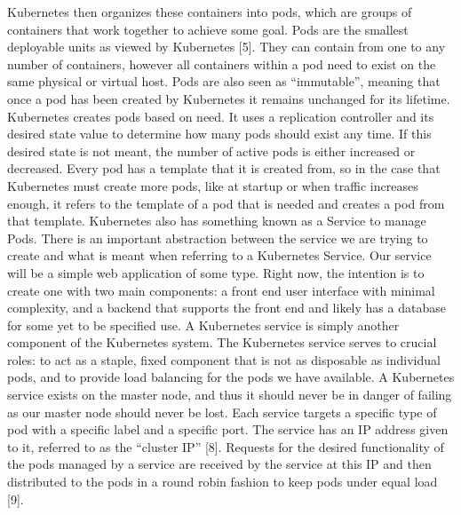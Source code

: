 \documentclass[thesis,proposal]{umassthesis}  %
\begin{document}
Kubernetes then organizes these containers into pods, which are groups of containers that work together to achieve some goal. Pods are the smallest deployable units as viewed by Kubernetes [5]. They can contain from one to any number of containers, however all containers within a pod need to exist on the same physical or virtual host. Pods are also seen as “immutable”, meaning that once a pod has been created by Kubernetes it remains unchanged for its lifetime. Kubernetes creates pods based on need. It uses a replication controller and its desired state value to determine how many pods should exist any time. If this desired state is not meant, the number of active pods is either increased or decreased. Every pod has a template that it is created from, so in the case that Kubernetes must create more pods, like at startup or when traffic increases enough, it refers to the template of a pod that is needed and creates a pod from that template.
Kubernetes also has something known as a Service to manage Pods. There is an important abstraction between the service we are trying to create and what is meant when referring to a Kubernetes Service. Our service will be a simple web application of some type. Right now, the intention is to create one with two main components: a front end user interface with minimal complexity, and a backend that supports the front end and likely has a database for some yet to be specified use.
A Kubernetes service is simply another component of the Kubernetes system. The Kubernetes service serves to crucial roles: to act as a staple, fixed component that is not as disposable as individual pods, and to provide load balancing for the pods we have available. A Kubernetes service exists on the master node, and thus it should never be in danger of failing as our master node should never be lost. Each service targets a specific type of pod with a specific label and a specific port. The service has an IP address given to it, referred to as the “cluster IP” [8]. Requests for the desired functionality of the pods managed by a service are received by the service at this IP and then distributed to the pods in a round robin fashion to keep pods under equal load [9].
\end{document}
